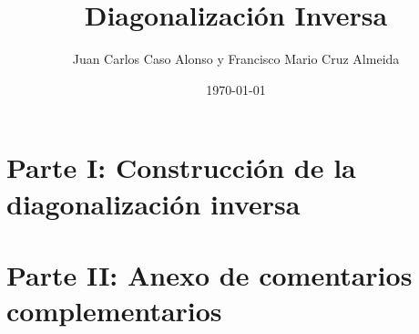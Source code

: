 \documentclass[notitlepage]{report}
\title{Diagonalización Inversa}
\author{Juan Carlos Caso Alonso y Francisco Mario Cruz Almeida}
\date{\today}
\begin{document}
	
	\maketitle
	\thispagestyle{empty}
	
	
		
	
	\tableofcontents
	
	\part{Parte I: Construcción de la diagonalización inversa}
	
	
	
	
	
	\part{Parte II: Anexo de comentarios complementarios}
	
	
	
\end{document}
